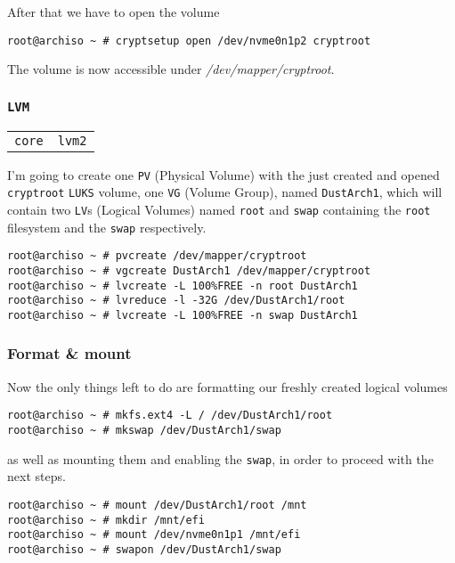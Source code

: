 \documentclass[9pt]{report}
\newenvironment{packagetable}
{\begin{longtabu}to \textwidth [b]{X[1,r]|X[1,l]}}
{\end{longtabu}}
\begin{document}
After that we have to open the volume


\begin{verbatim}
root@archiso ~ # cryptsetup open /dev/nvme0n1p2 cryptroot
\end{verbatim}

The volume is now accessible under \textit{/dev/mapper/cryptroot}.



\newpage

\hypertarget{x-lvm}{\subsubsection{\texttt{LVM}}}
\begin{packagetable}
    \texttt{core} & \texttt{lvm2} \\ 
\end{packagetable}

I’m going to create one \texttt{PV} (Physical Volume) with the just created and opened \texttt{cryptroot} \texttt{LUKS} volume, one \texttt{VG} (Volume Group), named \texttt{DustArch1}, which will contain two \texttt{LV}s (Logical Volumes) named \texttt{root} and \texttt{swap} containing the \texttt{root} filesystem and the \texttt{swap} respectively.


\begin{verbatim}
root@archiso ~ # pvcreate /dev/mapper/cryptroot
root@archiso ~ # vgcreate DustArch1 /dev/mapper/cryptroot
root@archiso ~ # lvcreate -L 100%FREE -n root DustArch1
root@archiso ~ # lvreduce -l -32G /dev/DustArch1/root
root@archiso ~ # lvcreate -L 100%FREE -n swap DustArch1
\end{verbatim}


\newpage

\hypertarget{x-format-and-mount}{\subsubsection{Format \& mount}}
Now the only things left to do are formatting our freshly created logical volumes


\begin{verbatim}
root@archiso ~ # mkfs.ext4 -L / /dev/DustArch1/root
root@archiso ~ # mkswap /dev/DustArch1/swap
\end{verbatim}

as well as mounting them and enabling the \texttt{swap}, in order to proceed with the next steps.


\begin{verbatim}
root@archiso ~ # mount /dev/DustArch1/root /mnt
root@archiso ~ # mkdir /mnt/efi
root@archiso ~ # mount /dev/nvme0n1p1 /mnt/efi
root@archiso ~ # swapon /dev/DustArch1/swap
\end{verbatim}
\end{document}
